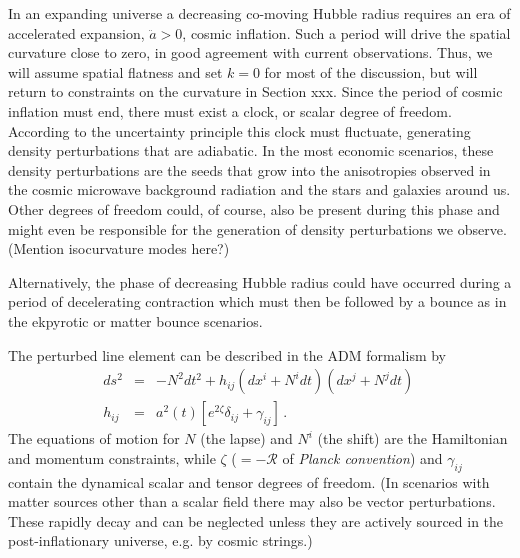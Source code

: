 In an expanding universe a decreasing co-moving Hubble radius requires an era of accelerated expansion, $\ddot{a}>0$, cosmic inflation. Such a period will drive the spatial curvature close to zero, in good agreement with current observations. Thus, we will assume spatial flatness and set $k=0$ for most of the discussion, but will return to constraints on the curvature in Section xxx. Since the period of cosmic inflation must end, there must exist a clock, or scalar degree of freedom. According to the uncertainty principle this clock must fluctuate, generating density perturbations that are adiabatic. In the most economic scenarios, these density perturbations are the seeds that grow into the anisotropies observed in the cosmic microwave background radiation and the stars and galaxies around us. Other degrees of freedom could, of course, also be present during this phase and might even be responsible for the generation of density perturbations we observe. (Mention isocurvature modes here?)

Alternatively, the phase of decreasing Hubble radius could have occurred during a period of decelerating contraction which must then be followed by a bounce as in the ekpyrotic or matter bounce scenarios. 

The perturbed line element can be described in the ADM formalism by
\begin{eqnarray}
\label{eq:metric}
ds^2&=&-N^2dt^2 +h_{ij}(dx^i+N^idt)(dx^j+N^jdt)\,\nonumber\\
h_{ij}&=&a^2(t)[e^{2\zeta}\delta_{ij}+\gamma_{ij}]\,.
\end{eqnarray}
The equations of motion for $N$ (the lapse) and $N^i$ (the shift) are the Hamiltonian and momentum constraints, while $\zeta$ ($=-\mathcal{R}$ of {\it Planck convention}) and $\gamma_{ij}$ contain the dynamical scalar and tensor degrees of freedom. (In scenarios with matter sources other than a scalar field there may also be vector perturbations. These rapidly decay and can be neglected unless they are actively sourced in the post-inflationary universe, e.g. by cosmic strings.)

